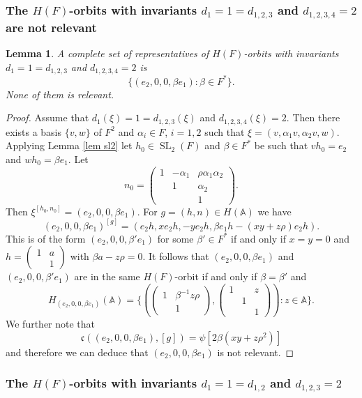 \documentclass[12pt]{amsart}
\newcommand{\SL}{\operatorname{SL}}
\newcommand{\A}{\mathbb{A}}
\newcommand{\sm}[4]{\left(\begin{smallmatrix}{#1}&{#2}\\{#3}&{#4}\end{smallmatrix}\right)}
\renewcommand{\c}{\mathfrak{c}}
\newtheorem{lemma}[theorem]{Lemma}
\theoremstyle{remark}
\begin{document}
\subsubsection{The $H(F)$-orbits with invariants $d_1=1=d_{1,2,3}$ and $d_{1,2,3,4}=2$ are not relevant}
\begin{lemma}
A complete set of representatives of $H(F)$-orbits with invariants $d_1=1=d_{1,2,3}$ and $d_{1,2,3,4}=2$ is 
\[
\{(e_2,0,0,\beta e_1):\beta\in F^*\}.
\]
None of them is relevant.
\end{lemma}
\begin{proof}
Assume that $d_1(\xi)=1=d_{1,2,3}(\xi)$ and $d_{1,2,3,4}(\xi)=2$. Then there exists a basis $\{v,w\}$ of $F^2$ and $\alpha_i\in F$, $i=1,2$ such that $\xi=(v,\alpha_1 v,\alpha_2 v,w)$. 
Applying Lemma \ref{lem sl2} let $h_0\in \SL_2(F)$ and $\beta\in F^*$ be such that $vh_0=e_2$ and $wh_0=\beta e_1$. Let 
\[
n_0=\begin{pmatrix}
1 & -\alpha_1 & \rho\alpha_1\alpha_2\\  & 1 & \alpha_2 \\ & & 1
\end{pmatrix}.
\]
Then $\xi^{[h_0,n_0]}=(e_2,0,0,\beta e_1)$.
For $g=(h,n)\in H(\A)$ we have
\[
(e_2,0,0,\beta e_1)^{[g]}=(e_2 h,xe_2h,-ye_2h,\beta e_1h-(xy+z\rho)e_2 h).
\]
This is of the form $(e_2,0,0,\beta' e_1)$ for some $\beta'\in F^*$ if and only if $x=y=0$ and $h=\sm{1}{a}{}{1}$ with $\beta a-z\rho=0$.
It follows that $(e_2,0,0,\beta e_1)$ and $(e_2,0,0,\beta' e_1)$ are in the same $H(F)$-orbit if and only if $\beta=\beta'$ and
\[
H_{(e_2,0,0,\beta e_1)}(\A)=\{  (\begin{pmatrix} 1 & \beta^{-1}z\rho \\  & 1 \end{pmatrix},    \begin{pmatrix}
1 &  & z\\  & 1 &  \\ & & 1
\end{pmatrix}):z\in \A  \}.
\]
We further note that
\[
\c((e_2,0,0,\beta e_1),[g])=\psi[2\beta(xy+z\rho^2)]
\]
and therefore we can deduce that $(e_2,0,0,\beta e_1)$ is not relevant. 


\end{proof}

\subsubsection{The $H(F)$-orbits with invariants $d_1=1=d_{1,2}$ and $d_{1,2,3}=2$}
\end{document}
